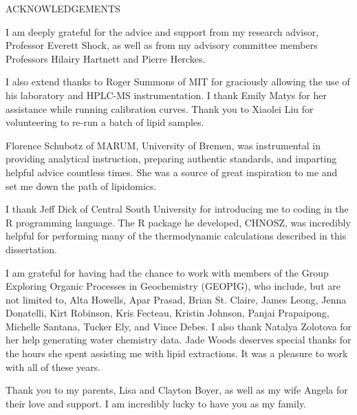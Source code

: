 \begin{center}
    \doublespace
    ACKNOWLEDGEMENTS
\end{center}

I am deeply grateful for the advice and support from my research advisor, Professor Everett Shock, as well as from my advisory committee members Professors Hilairy Hartnett and Pierre Herckes.

I also extend thanks to Roger Summons of MIT for graciously allowing the use of his laboratory and HPLC-MS instrumentation. I thank Emily Matys for her assistance while running calibration curves. Thank you to Xiaolei Liu for volunteering to re-run a batch of lipid samples.

Florence Schubotz of MARUM, University of Bremen, was instrumental in providing analytical instruction, preparing authentic standards, and imparting helpful advice countless times. She was a source of great inspiration to me and set me down the path of lipidomics.

I thank Jeff Dick of Central South University for introducing me to coding in the R programming language. The R package he developed, CHNOSZ, was incredibly helpful for performing many of the thermodynamic calculations described in this dissertation.

I am grateful for having had the chance to work with members of the Group Exploring Organic Processes in Geochemistry (GEOPIG), who include, but are not limited to, Alta Howells, Apar Prasad, Brian St. Claire, James Leong, Jenna Donatelli, Kirt Robinson, Kris Fecteau, Kristin Johnson, Panjai Prapaipong, Michelle Santana, Tucker Ely, and Vince Debes. I also thank Natalya Zolotova for her help generating water chemistry data. Jade Woods deserves special thanks for the hours she spent assisting me with lipid extractions. It was a pleasure to work with all of these years.

Thank you to my parents, Lisa and Clayton Boyer, as well as my wife Angela for their love and support. I am incredibly lucky to have you as my family.